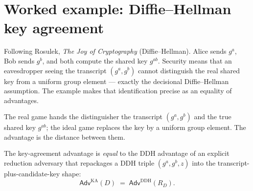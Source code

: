 \chapter{Worked example: Diffie--Hellman key agreement}

Following Rosulek, \emph{The Joy of Cryptography} (Diffie--Hellman). Alice sends
$g^{a}$, Bob sends $g^{b}$, and both compute the shared key $g^{ab}$. Security means
that an eavesdropper seeing the transcript $(g^{a}, g^{b})$ cannot distinguish the
real shared key from a uniform group element --- exactly the decisional
Diffie--Hellman assumption. The example makes that identification precise as an
equality of advantages.

\begin{definition}
  \label{def:ka-game}
  \leanok
  The real game hands the distinguisher the transcript $(g^{a}, g^{b})$ and the
  true shared key $g^{ab}$; the ideal game replaces the key by a uniform group
  element. The advantage is the distance between them.
\end{definition}

\begin{theorem}
  \label{thm:ka-ddh}
  \leanok
  The key-agreement advantage is \emph{equal} to the DDH advantage of an explicit
  reduction adversary that repackages a DDH triple $(g^{a}, g^{b}, z)$ into the
  transcript-plus-candidate-key shape:
  \[
    \mathsf{Adv}^{\mathrm{KA}}(D) \;=\; \mathsf{Adv}^{\mathrm{DDH}}(R_D).
  \]
\end{theorem}
